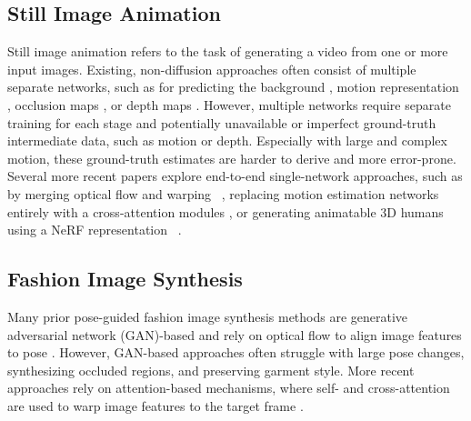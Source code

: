     \subsection{Still Image Animation}
        Still image animation refers to the task of generating a video from one or more input images. Existing, non-diffusion approaches often consist of multiple separate networks, such as for predicting the background \cite{articulated_animation,photo_wake-up,thin_plate_spline}, motion representation \cite{eulerian_motion,monkey-net,fomm,articulated_animation,latent_image_animator,thin_plate_spline}, occlusion maps \cite{fomm,articulated_animation,photo_wake-up,thin_plate_spline}, or depth maps \cite{dain}. %
        However, multiple networks require separate training for each stage and potentially unavailable or imperfect ground-truth intermediate data, such as motion or depth. Especially with large and complex motion, these ground-truth estimates are harder to derive and more error-prone. Several more recent papers explore end-to-end single-network approaches, such as by merging optical flow and warping ~\cite{film}, replacing motion estimation networks entirely with a cross-attention modules \cite{implicit_warping}, or generating animatable 3D humans using a NeRF representation ~\cite{eva3d}. %

    \subsection{Fashion Image Synthesis}
        Many prior pose-guided fashion image synthesis methods are generative adversarial network (GAN)-based and rely on optical flow to align image features to pose \cite{pose_with_style,DiOr,try_on_gan,global_flow_local_attn,pise,progressive_pose_transfer}. %
        However, GAN-based approaches often struggle with large pose changes, synthesizing occluded regions, and preserving garment style. More recent approaches rely on attention-based mechanisms, where self- and cross-attention are used to warp image features to the target frame \cite{viton_hd,DynaST,global_flow_local_attn}. 

